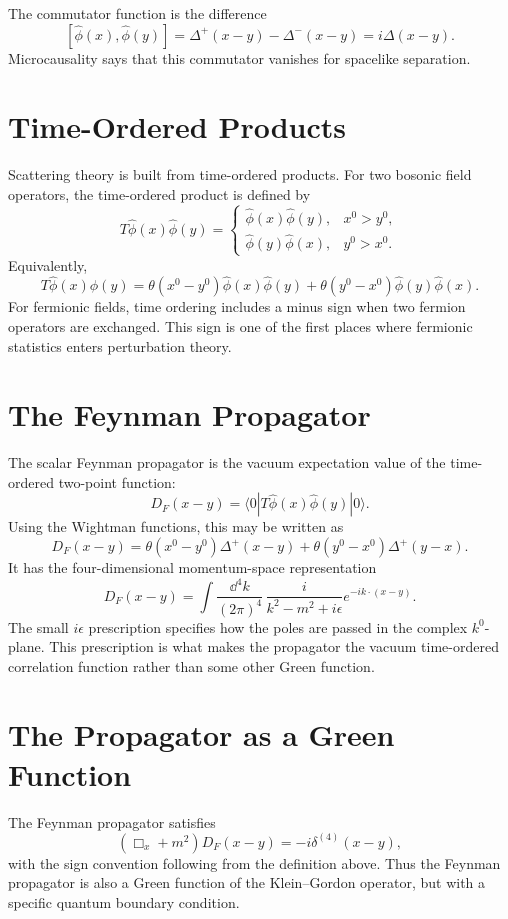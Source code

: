 The commutator function is the difference
\[
    [\hat\phi(x),\hat\phi(y)]
    = \Delta^+(x-y)-\Delta^-(x-y)
    = i\Delta(x-y).
\]
Microcausality says that this commutator vanishes for spacelike separation.

\section{Time-Ordered Products}

Scattering theory is built from time-ordered products. For two bosonic field
operators, the time-ordered product is defined by
\[
    T\hat\phi(x)\hat\phi(y)
    =
    \begin{cases}
        \hat\phi(x)\hat\phi(y), & x^0>y^0,\\
        \hat\phi(y)\hat\phi(x), & y^0>x^0.
    \end{cases}
\]
Equivalently,
\[
    T\hat\phi(x)\hat\phi(y)
    = \theta(x^0-y^0)\hat\phi(x)\hat\phi(y)
      +\theta(y^0-x^0)\hat\phi(y)\hat\phi(x).
\]
For fermionic fields, time ordering includes a minus sign when two fermion
operators are exchanged. This sign is one of the first places where fermionic
statistics enters perturbation theory.

\section{The Feynman Propagator}

The scalar Feynman propagator is the vacuum expectation value of the time-ordered
two-point function:
\[
    D_F(x-y)
    = \langle0|T\hat\phi(x)\hat\phi(y)|0\rangle.
\]
Using the Wightman functions, this may be written as
\[
    D_F(x-y)
    = \theta(x^0-y^0)\Delta^+(x-y)
      +\theta(y^0-x^0)\Delta^+(y-x).
\]
It has the four-dimensional momentum-space representation
\[
    D_F(x-y)
    = \int\frac{\dd^4k}{(2\pi)^4}\,
      \frac{i}{k^2-m^2+i\epsilon}
      e^{-ik\cdot(x-y)}.
\]
The small \(i\epsilon\) prescription specifies how the poles are passed in the
complex \(k^0\)-plane. This prescription is what makes the propagator the
vacuum time-ordered correlation function rather than some other Green function.

\section{The Propagator as a Green Function}

The Feynman propagator satisfies
\[
    (\Box_x+m^2)D_F(x-y)
    = -i\delta^{(4)}(x-y),
\]
with the sign convention following from the definition above. Thus the Feynman
propagator is also a Green function of the Klein--Gordon operator, but with a
specific quantum boundary condition.


